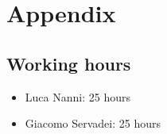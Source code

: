 \chapter{Appendix}
\section{Working hours}
\begin{itemize}
	\item Luca Nanni: 25 hours
	\item Giacomo Servadei: 25 hours
\end{itemize}